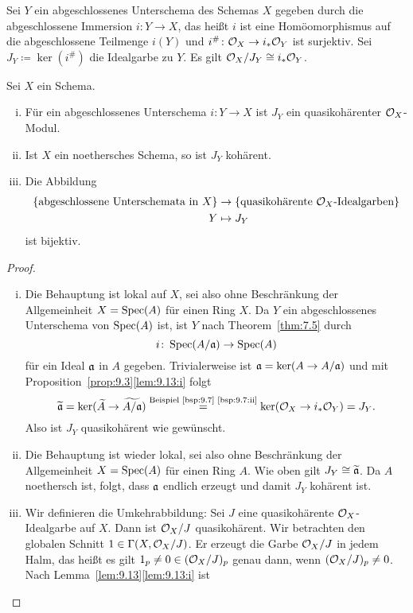 \begin{defn}
\label{defn:9.14}
	Sei $Y$ ein abgeschlossenes Unterschema des Schemas $X$ gegeben durch die abgeschlossene Immersion $i \colon Y \to X$, das heißt $i$ ist eine Homöomorphismus auf die abgeschlossene Teilmenge $i(Y)$ und $i^{\#}\colon \mathcal{O}_X \to i_*\mathcal{O}_Y$ ist surjektiv. Sei $J_Y\coloneqq \ker(i^{\#})$ die Idealgarbe zu $Y$. Es gilt $\mathcal{O}_X/J_Y \cong i_*\mathcal{O}_Y$.
\end{defn}

\begin{prop}
\label{prop:9.15}
	Sei $X$ ein Schema.
	\begin{enumerate}[i)]
		\item\label{prop:9.15:i} Für ein abgeschlossenes Unterschema $i \colon Y \to X$ ist $J_Y$ ein quasikohärenter $\mathcal{O}_X$-Modul.
		\item\label{prop:9.15:ii} Ist $X$ ein noethersches Schema, so ist $J_Y$ kohärent.
		\item\label{prop:9.15:iii} Die Abbildung
		\begin{align*}
			\{\text{abgeschlossene Unterschemata in } X\} & \to \{\text{quasikohärente }\mathcal{O}_X\text{-Idealgarben}\}\\
			Y &\mapsto J_Y
		\end{align*}
		ist bijektiv.
 	\end{enumerate}
 	\begin{proof}
 		\begin{enumerate}[i)]
 			\item Die Behauptung ist lokal auf $X$, sei also ohne Beschränkung der Allgemeinheit $X=\operatorname{Spec}(A)$ für einen Ring $X$. Da $Y$ ein abgeschlossenes Unterschema von $\operatorname{Spec}(A)$ ist, ist $Y$ nach Theorem~\ref{thm:7.5} durch
 			\[
 				i\colon \operatorname{Spec}(A/\mathfrak{a}) \to \operatorname{Spec}(A)
 			\]
 			für ein Ideal $\mathfrak{a}$ in $A$ gegeben. Trivialerweise ist $\mathfrak{a} = \ker(A \to A/\mathfrak{a})$ und mit Proposition~\ref{prop:9.3}\ref{lem:9.13:i} folgt
 			\[
 				\widetilde{\mathfrak{a}} = \ker(\widetilde{A} \to \widetilde{A/\mathfrak{a}}) \overset{\text{Beispiel~\ref{bsp:9.7}~\ref{bsp:9.7:ii}}}{=} \ker(\mathcal{O}_X \to i_* \mathcal{O}_Y) = J_Y.
 			\]
 			Also ist $J_Y$ quasikohärent wie gewünscht.
 			\item Die Behauptung ist wieder lokal, sei also ohne Beschränkung der Allgemeinheit $X = \operatorname{Spec}(A)$ für einen Ring $A$. Wie oben gilt $J_Y \cong \widetilde{\mathfrak{a}}$. Da $A$ noethersch ist, folgt, dass $\mathfrak{a}$ endlich erzeugt und damit $J_Y$ kohärent ist.
 			\item Wir definieren die Umkehrabbildung: Sei $J$ eine quasikohärente $\mathcal{O}_X$-Idealgarbe auf $X$. Dann ist $\mathcal{O}_X/J$ quasikohärent. Wir betrachten den globalen Schnitt $1 \in \Gamma(X,\mathcal{O}_X/J)$. Er erzeugt die Garbe $\mathcal{O}_X/J$ in jedem Halm, das heißt es gilt $1_p \ne 0 \in (\mathcal{O}_X/J)_p$ genau dann, wenn $(\mathcal{O}_X/J)_p \ne 0$. Nach Lemma~\ref{lem:9.13}\ref{lem:9.13:i} ist

\end{enumerate}
\end{proof}
\end{prop}
